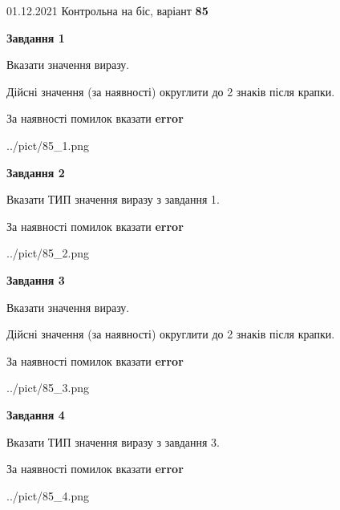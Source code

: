 \documentclass[11pt, ukrainian]{article}
\begin{document}
{01.12.2021 Контрольна на біс, варіант  \No \textbf { 85 }\par}
{
\begin {large}
{\begin {center}\textbf{Завдання 1}\end {center}}\par
Вказати значення виразу. \par
Дійсні значення (за наявності) округлити до 2 знаків після крапки. \par
За наявності помилок вказати \textbf{error}

\begin{center}
	{../pict/85_1.png}
\end{center}
\newpage

{\begin {center}\textbf{Завдання 2}\end {center}}\par
Вказати ТИП значення виразу з завдання 1. \par
За наявності помилок вказати \textbf{error}

\begin{center}
	{../pict/85_2.png}
\end{center}
\newpage

{\begin {center}\textbf{Завдання 3}\end {center}}\par
Вказати значення виразу. \par
Дійсні значення (за наявності) округлити до 2 знаків після крапки. \par
За наявності помилок вказати \textbf{error}

\begin{center}
	{../pict/85_3.png}
\end{center}
\newpage

{\begin {center}\textbf{Завдання 4}\end {center}}\par
Вказати ТИП значення виразу з завдання 3. \par
За наявності помилок вказати \textbf{error}

\begin{center}
	{../pict/85_4.png}
\end{center}
\newpage


\end{large}}
\end{document}
